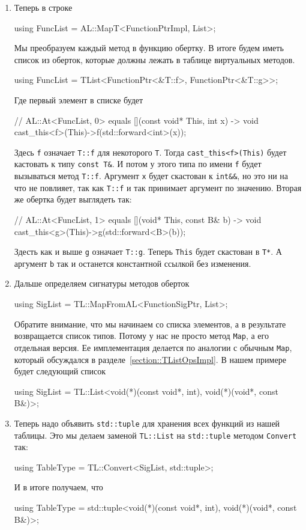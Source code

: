 \begin{enumerate}
\item Теперь в строке
\begin{cppcode}[numbers = none]
using FuncList = AL::MapT<FunctionPtrImpl, List>;
\end{cppcode}
Мы преобразуем каждый метод в функцию обертку. В итоге будем иметь список из оберток, которые должны лежать в таблице виртуальных методов.
\begin{cppcode}[numbers = none]
using FuncList = TList<FunctionPtr<&T::f>, FunctionPtr<&T::g>>;
\end{cppcode}
Где первый элемент в списке будет
\begin{cppcode}[numbers = none]
// AL::At<FuncList, 0> equals
[](const void* This, int x) -> void {
    cast_this<f>(This)->f(std::forward<int>(x));
}
\end{cppcode}
Здесь \verb"f" означает \verb"T::f" для некоторого \verb"T".
Тогда \verb"cast_this<f>(This)" будет кастовать к типу \verb"const T&".
И потом у этого типа по имени \verb"f" будет вызываться метод \verb"T::f".
Аргумент \verb"x" будет скастован к \verb"int&&", но это ни на что не повлияет, так как \verb"T::f" и так принимает аргумент по значению.
Вторая же обертка будет выглядеть так:
\begin{cppcode}[numbers = none]
// AL::At<FuncList, 1> equals
[](void* This, const B& b) -> void {
    cast_this<g>(This)->g(std::forward<B>(b));
}
\end{cppcode}
Здесть как и выше \verb"g" означает \verb"T::g".
Теперь \verb"This" будет скастован в \verb"T*".
А аргумент \verb"b" так и останется константной ссылкой без изменения.

\item Дальше определяем сигнатуры методов оберток
\begin{cppcode}[numbers = none]
using SigList = TL::MapFromAL<FunctionSigPtr, List>;
\end{cppcode}
Обратите внимание, что мы начинаем со списка элементов, а в результате возвращается список типов.
Потому у нас не просто метод \verb"Map", а его отдельная версия.
Ее имплементация делается по аналогии с обычным \verb"Map", который обсуждался в разделе~\ref{section::TListOpsImpl}.
В нашем примере будет следующий список
\begin{cppcode}[numbers = none]
using SigList = TL::List<void(*)(const void*, int), void(*)(void*, const B&)>;
\end{cppcode}

\item Теперь надо объявить \verb"std::tuple" для хранения всех функций из нашей таблицы.
Это мы делаем заменой \verb"TL::List" на \verb"std::tuple" методом \verb"Convert" так:
\begin{cppcode}[numbers = none]
using TableType = TL::Convert<SigList, std::tuple>;
\end{cppcode}
И в итоге получаем, что
\begin{cppcode}[numbers = none]
using TableType = std::tuple<void(*)(const void*, int), void(*)(void*, const B&)>;
\end{cppcode}


\end{enumerate}
